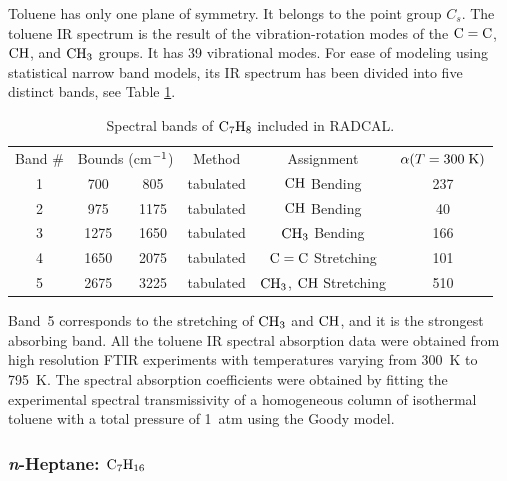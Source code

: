 Toluene has only one plane of symmetry. It belongs to the point group $C_{s}$. The toluene IR spectrum is the result of the vibration-rotation modes of the $\rm C=C$, $\rm CH$, and $\rm CH_3$ groups. It has 39 vibrational modes. For ease of modeling using statistical narrow band models, its IR spectrum has been divided into five distinct bands, see Table \ref{Table::C7H8}.
\begin{table}[ht]
   \centering
   \caption{Spectral bands of $\rm C_7H_8$ included in RADCAL.}
   \vspace{0.1in}
   \label{Table::C7H8}
   \begin{tabular}{|c|c|c|c|c|c|}
    \hline
    Band \# & \multicolumn{2}{|l|}{Bounds (cm$\rm ^{-1}$) } & Method & Assignment & $\alpha(T=300 \; {\rm K})$\\
    \cline{1-6}
    1 & 700  & 805  & tabulated &  $\rm CH$ Bending      & 237 \\
    2 & 975  & 1175 & tabulated &  $\rm CH$ Bending      & 40  \\
    3 & 1275 & 1650 & tabulated &  $\rm CH_3$ Bending    & 166 \\
    4 & 1650 & 2075 & tabulated &  $\rm C=C$ Stretching  & 101 \\
    5 & 2675 & 3225 & tabulated &  $\rm CH_3$, $\rm CH$  Stretching & 510  \\
    \hline
   \end{tabular}
\end{table}
Band~5 corresponds to the stretching of $\rm CH_3$ and $\rm CH$, and it is the strongest absorbing band. All the toluene IR spectral absorption data were obtained from high resolution FTIR experiments with temperatures varying from 300~K to 795~K. The spectral absorption coefficients were obtained by fitting the experimental spectral transmissivity of a homogeneous column of isothermal toluene with a total pressure of 1~atm using the Goody model.

\subsubsection{\textit{n}-Heptane: $\rm C_7H_{16}$}

